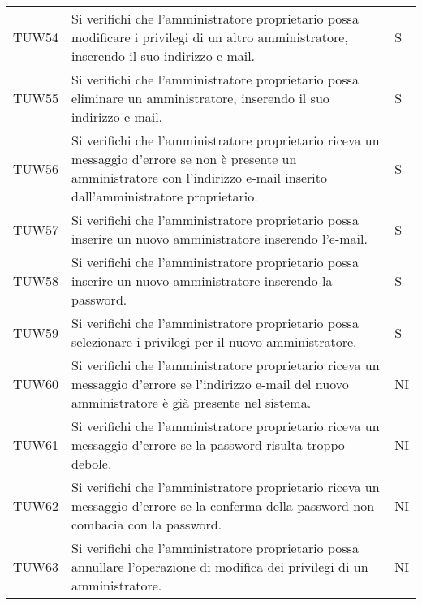 {\begin{longtable}{ c C{13cm} C{1cm}}
TUW54 & Si verifichi che l’amministratore proprietario possa modificare i privilegi di un altro amministratore, inserendo il suo indirizzo e-mail. & S \\
TUW55 & Si verifichi che l’amministratore proprietario possa eliminare un amministratore, inserendo il suo indirizzo e-mail. & S \\
TUW56 & Si verifichi che l’amministratore proprietario riceva un messaggio d'errore se non è presente un amministratore con l'indirizzo e-mail inserito dall'amministratore proprietario. & S \\
TUW57 & Si verifichi che l’amministratore proprietario possa inserire un nuovo amministratore inserendo l’e-mail. & S \\
TUW58 & Si verifichi che l’amministratore proprietario possa inserire un nuovo amministratore inserendo la password. & S \\
TUW59 & Si verifichi che l’amministratore proprietario possa selezionare i privilegi per il nuovo amministratore. & S \\
TUW60 & Si verifichi che l’amministratore proprietario riceva un messaggio d'errore se l'indirizzo e-mail del nuovo amministratore è già presente nel sistema. & NI \\
TUW61 & Si verifichi che l’amministratore proprietario riceva un messaggio d'errore se la password risulta troppo debole. & NI \\
TUW62 & Si verifichi che l’amministratore proprietario riceva un messaggio d'errore se la conferma della password non combacia con la password. & NI \\
TUW63 & Si verifichi che l’amministratore proprietario possa annullare l'operazione di modifica dei privilegi di un amministratore.  & NI \\
\end{longtable}
}